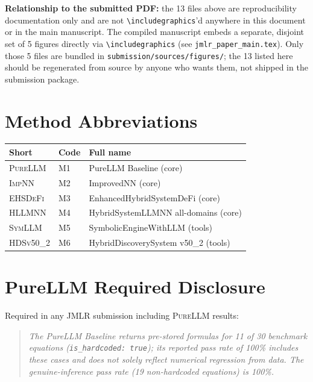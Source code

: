 \documentclass[twoside,11pt]{article}
\newcommand{\PureLLM}{\textsc{PureLLM}}
\newcommand{\INN}{\textsc{ImpNN}}
\newcommand{\EHD}{\textsc{EHSDeFi}}
\newcommand{\HSL}{\textsc{HLLMNN}}
\newcommand{\SEL}{\textsc{SymLLM}}
\newcommand{\HDS}{\textsc{HDSv50\_2}}
\begin{document}
\noindent\textbf{Relationship to the submitted PDF:} the 13 files
above are reproducibility documentation only and are not
\verb|\includegraphics|'d anywhere in this document or in the main
manuscript. The compiled manuscript embeds a separate, disjoint set
of 5 figures directly via \verb|\includegraphics| (see
\texttt{jmlr\_paper\_main.tex}). Only those 5 files are bundled in
\texttt{submission/sources/figures/}; the 13 listed here should be
regenerated from source by anyone who wants them, not shipped in the
submission package.

\section{Method Abbreviations}
\label{app:abbrev}

\begin{tabular}{L{1.8cm} L{2.5cm} L{6.0cm}}
\toprule
\textbf{Short} & \textbf{Code} & \textbf{Full name}\\
\midrule
\PureLLM & M1 & PureLLM Baseline (core)\\
\INN     & M2 & ImprovedNN (core)\\
\EHD     & M3 & EnhancedHybridSystemDeFi (core)\\
\HSL     & M4 & HybridSystemLLMNN all-domains (core)\\
\SEL     & M5 & SymbolicEngineWithLLM (tools)\\
\HDS     & M6 & HybridDiscoverySystem v50\_2 (tools)\\
\bottomrule
\end{tabular}

\section{PureLLM Required Disclosure}
\label{app:disclosure}

Required in any JMLR submission including \PureLLM{} results:

\begin{quote}
\textit{The PureLLM Baseline returns pre-stored formulas for 11 of 30
benchmark equations (\texttt{is\_hardcoded: true}); its reported pass rate
of 100\% includes these cases and does not solely reflect numerical
regression from data.  The genuine-inference pass rate (19 non-hardcoded
equations) is 100\%.}
\end{quote}

\end{document}
